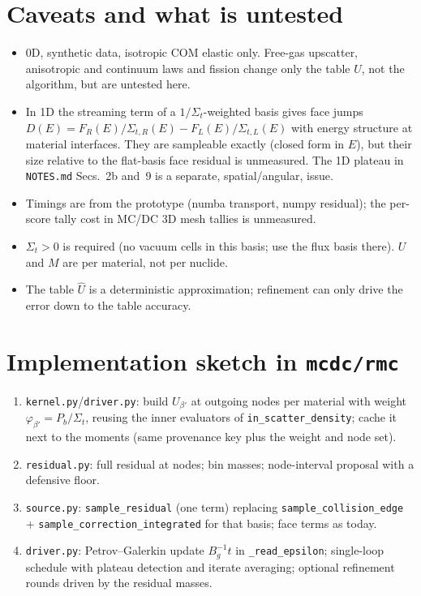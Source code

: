 \documentclass[11pt]{article}
\newcommand{\Sigt}{\Sigma_t}
\begin{document}
\section{Caveats and what is untested}
\begin{itemize}
  \item 0D, synthetic data, isotropic COM elastic only. Free-gas upscatter, anisotropic
  and continuum laws and fission change only the table $U$, not the algorithm, but are
  untested here.
  \item In 1D the streaming term of a $1/\Sigt$-weighted basis gives face jumps
  $D(E)=F_R(E)/\Sigma_{t,R}(E)-F_L(E)/\Sigma_{t,L}(E)$ with energy structure at material
  interfaces. They are sampleable exactly (closed form in $E$), but their size relative
  to the flat-basis face residual is unmeasured. The 1D plateau in \texttt{NOTES.md}
  Secs.~2b and~9 is a separate, spatial/angular, issue.
  \item Timings are from the prototype (numba transport, numpy residual); the per-score tally
  cost in MC/DC 3D mesh tallies is unmeasured.
  \item $\Sigt>0$ is required (no vacuum cells in this basis; use the flux basis there).
  $U$ and $M$ are per material, not per nuclide.
  \item The table $\hat U$ is a deterministic approximation; refinement can only drive the
  error down to the table accuracy.
\end{itemize}

\section{Implementation sketch in \texttt{mcdc/rmc}}
\begin{enumerate}
  \item \texttt{kernel.py}/\texttt{driver.py}: build $U_{\beta'}$ at outgoing nodes per
  material with weight $\varphi_{\beta'}=P_{b}/\Sigt$, reusing the inner evaluators of
  \texttt{in\_scatter\_density}; cache it next to the moments (same provenance key plus
  the weight and node set).
  \item \texttt{residual.py}: full residual at nodes; bin masses; node-interval proposal
  with a defensive floor.
  \item \texttt{source.py}: \texttt{sample\_residual} (one term) replacing
  \texttt{sample\_collision\_edge} + \texttt{sample\_correction\_integrated} for that
  basis; face terms as today.
  \item \texttt{driver.py}: Petrov--Galerkin update $B_g^{-1}t$ in
  \texttt{\_read\_epsilon}; single-loop schedule with plateau detection and iterate
  averaging; optional refinement rounds driven by the residual masses.
\end{enumerate}
\end{document}

